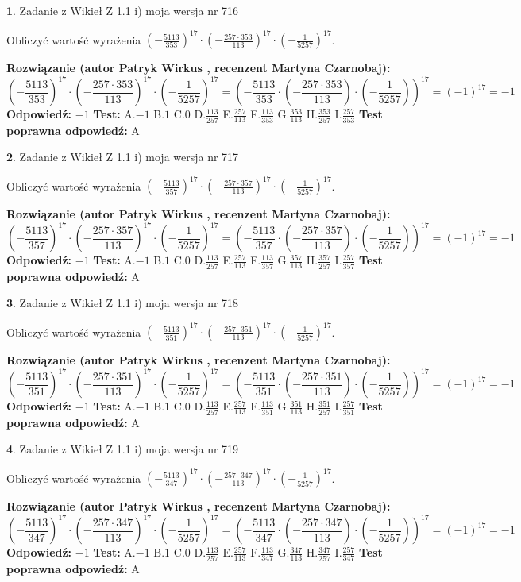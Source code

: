 \documentclass[12pt, a4paper]{article}
\theoremstyle{definition} %
\newtheorem{zad}{}
\newcommand{\zadStart}[1]{\begin{zad}#1\newline}
\newcommand{\zadStop}{\end{zad}}
\newcommand{\rozwStart}[2]{\noindent \textbf{Rozwiązanie (autor #1 , recenzent #2): }\newline}
\newcommand{\rozwStop}{\newline}
\newcommand{\odpStart}{\noindent \textbf{Odpowiedź:}\newline}
\newcommand{\odpStop}{\newline}
\newcommand{\testStart}{\noindent \textbf{Test:}\newline}
\newcommand{\testStop}{\newline}
\newcommand{\kluczStart}{\noindent \textbf{Test poprawna odpowiedź:}\newline}
\newcommand{\kluczStop}{\newline}
\begin{document}
\zadStart{Zadanie z Wikieł Z 1.1 i) moja wersja nr 716}

Obliczyć wartość wyrażenia $(-\frac{5113}{353})^{17} \cdot (-\frac{257 \cdot 353}{113})^{17} \cdot (-\frac{1}{5257})^{17}$.
\zadStop
\rozwStart{Patryk Wirkus}{Martyna Czarnobaj}
$$(-\frac{5113}{353})^{17} \cdot (-\frac{257 \cdot 353}{113})^{17} \cdot (-\frac{1}{5257})^{17} = (-\frac{5113}{353} \cdot (-\frac{257 \cdot 353}{113}) \cdot (-\frac{1}{5257}))^{17} = (-1)^{17} = -1$$
\rozwStop
\odpStart
$-1$
\odpStop
\testStart
A.$-1$ B.$1$ C.$0$ D.$\frac{113}{257}$ E.$\frac{257}{113}$
F.$\frac{113}{353}$ G.$\frac{353}{113}$
H.$\frac{353}{257}$
I.$\frac{257}{353}$
\testStop
\kluczStart
A
\kluczStop



\zadStart{Zadanie z Wikieł Z 1.1 i) moja wersja nr 717}

Obliczyć wartość wyrażenia $(-\frac{5113}{357})^{17} \cdot (-\frac{257 \cdot 357}{113})^{17} \cdot (-\frac{1}{5257})^{17}$.
\zadStop
\rozwStart{Patryk Wirkus}{Martyna Czarnobaj}
$$(-\frac{5113}{357})^{17} \cdot (-\frac{257 \cdot 357}{113})^{17} \cdot (-\frac{1}{5257})^{17} = (-\frac{5113}{357} \cdot (-\frac{257 \cdot 357}{113}) \cdot (-\frac{1}{5257}))^{17} = (-1)^{17} = -1$$
\rozwStop
\odpStart
$-1$
\odpStop
\testStart
A.$-1$ B.$1$ C.$0$ D.$\frac{113}{257}$ E.$\frac{257}{113}$
F.$\frac{113}{357}$ G.$\frac{357}{113}$
H.$\frac{357}{257}$
I.$\frac{257}{357}$
\testStop
\kluczStart
A
\kluczStop



\zadStart{Zadanie z Wikieł Z 1.1 i) moja wersja nr 718}

Obliczyć wartość wyrażenia $(-\frac{5113}{351})^{17} \cdot (-\frac{257 \cdot 351}{113})^{17} \cdot (-\frac{1}{5257})^{17}$.
\zadStop
\rozwStart{Patryk Wirkus}{Martyna Czarnobaj}
$$(-\frac{5113}{351})^{17} \cdot (-\frac{257 \cdot 351}{113})^{17} \cdot (-\frac{1}{5257})^{17} = (-\frac{5113}{351} \cdot (-\frac{257 \cdot 351}{113}) \cdot (-\frac{1}{5257}))^{17} = (-1)^{17} = -1$$
\rozwStop
\odpStart
$-1$
\odpStop
\testStart
A.$-1$ B.$1$ C.$0$ D.$\frac{113}{257}$ E.$\frac{257}{113}$
F.$\frac{113}{351}$ G.$\frac{351}{113}$
H.$\frac{351}{257}$
I.$\frac{257}{351}$
\testStop
\kluczStart
A
\kluczStop



\zadStart{Zadanie z Wikieł Z 1.1 i) moja wersja nr 719}

Obliczyć wartość wyrażenia $(-\frac{5113}{347})^{17} \cdot (-\frac{257 \cdot 347}{113})^{17} \cdot (-\frac{1}{5257})^{17}$.
\zadStop
\rozwStart{Patryk Wirkus}{Martyna Czarnobaj}
$$(-\frac{5113}{347})^{17} \cdot (-\frac{257 \cdot 347}{113})^{17} \cdot (-\frac{1}{5257})^{17} = (-\frac{5113}{347} \cdot (-\frac{257 \cdot 347}{113}) \cdot (-\frac{1}{5257}))^{17} = (-1)^{17} = -1$$
\rozwStop
\odpStart
$-1$
\odpStop
\testStart
A.$-1$ B.$1$ C.$0$ D.$\frac{113}{257}$ E.$\frac{257}{113}$
F.$\frac{113}{347}$ G.$\frac{347}{113}$
H.$\frac{347}{257}$
I.$\frac{257}{347}$
\testStop
\kluczStart
A
\kluczStop
\end{document}

